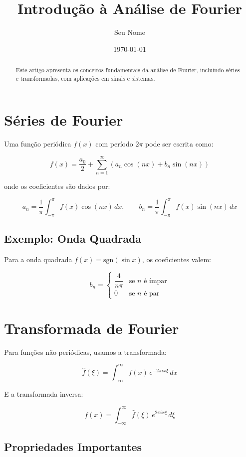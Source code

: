 \documentclass[12pt]{article}
\title{Introdução à Análise de Fourier}
\author{Seu Nome}
\date{\today}
\begin{document}
\maketitle

\begin{abstract}
Este artigo apresenta os conceitos fundamentais da análise de Fourier,
incluindo séries e transformadas, com aplicações em sinais e sistemas.
\end{abstract}

\section{Séries de Fourier}

Uma função periódica $f(x)$ com período $2\pi$ pode ser escrita como:

\[
f(x) = \frac{a_0}{2} + \sum_{n=1}^{\infty} \left( a_n \cos(nx) + b_n \sin(nx) \right)
\]

onde os coeficientes são dados por:

\[
a_n = \frac{1}{\pi} \int_{-\pi}^{\pi} f(x)\cos(nx)\,dx, \qquad
b_n = \frac{1}{\pi} \int_{-\pi}^{\pi} f(x)\sin(nx)\,dx
\]

\subsection{Exemplo: Onda Quadrada}

Para a onda quadrada $f(x) = \text{sgn}(\sin x)$, os coeficientes valem:

\[
b_n = \begin{cases} \dfrac{4}{n\pi} & \text{se } n \text{ é ímpar} \\ 0 & \text{se } n \text{ é par} \end{cases}
\]

\section{Transformada de Fourier}

Para funções não periódicas, usamos a transformada:

\[
\hat{f}(\xi) = \int_{-\infty}^{\infty} f(x)\, e^{-2\pi i x \xi}\, dx
\]

E a transformada inversa:

\[
f(x) = \int_{-\infty}^{\infty} \hat{f}(\xi)\, e^{2\pi i x \xi}\, d\xi
\]

\subsection{Propriedades Importantes}
\end{document}
